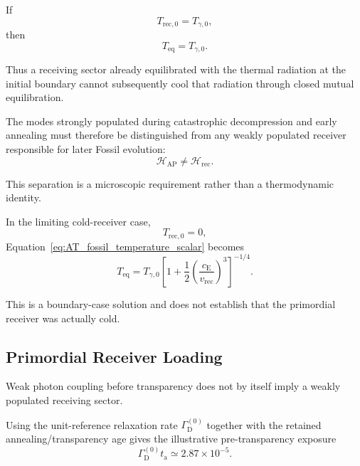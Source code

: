 If
\begin{equation}
    T_{\mathrm{rec},0}
    =
    T_{\gamma,0},
\end{equation}
then
\begin{equation}
    T_{\mathrm{eq}}
    =
    T_{\gamma,0}.
    \label{eq:AT_equal_temperature_check}
\end{equation}

Thus a receiving sector already equilibrated with the thermal radiation at the
initial boundary cannot subsequently cool that radiation through closed mutual
equilibration.

The modes strongly populated during catastrophic decompression and early
annealing must therefore be distinguished from any weakly populated receiver
responsible for later Fossil evolution:
\begin{equation}
    \mathcal H_{\mathrm{AP}}
    \neq
    \mathcal H_{\mathrm{rec}}.
    \label{eq:AT_AP_receiver_separation}
\end{equation}

This separation is a microscopic requirement rather than a thermodynamic
identity.

In the limiting cold-receiver case,
\begin{equation}
    T_{\mathrm{rec},0}
    =
    0,
\end{equation}
Equation~\eqref{eq:AT_fossil_temperature_scalar}
becomes
\begin{equation}
    T_{\mathrm{eq}}
    =
    T_{\gamma,0}
    \left[
        1+
        \frac{1}{2}
        \left(
            \frac{c_{\mathrm E}}{v_{\mathrm{rec}}}
        \right)^3
    \right]^{-1/4}.
    \label{eq:AT_cold_receiver_limit}
\end{equation}

This is a boundary-case solution and does not establish that the primordial
receiver was actually cold.


\subsection{Primordial Receiver Loading}

Weak photon coupling before transparency does not by itself imply a weakly
populated receiving sector.

Using the unit-reference relaxation rate
\(\Gamma_{\mathrm D}^{(0)}\)
together with the retained annealing/transparency age gives the illustrative
pre-transparency exposure
\begin{equation}
    \Gamma_{\mathrm D}^{(0)}t_{\mathrm a}
    \simeq
    2.87\times10^{-5}.
    \label{eq:AT_pretransparency_exposure}
\end{equation}

